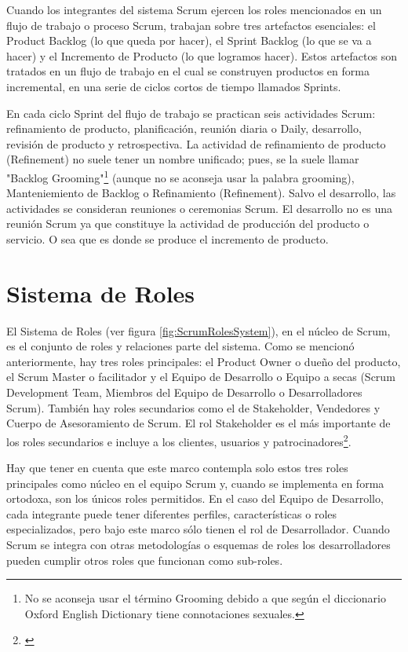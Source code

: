 Cuando los integrantes del sistema Scrum ejercen los roles mencionados en un flujo de trabajo o proceso Scrum, trabajan sobre tres artefactos esenciales: el Product Backlog (lo que queda por hacer), el Sprint Backlog (lo que se va a hacer) y el Incremento de Producto (lo que logramos hacer). Estos artefactos son tratados en un flujo de trabajo en el cual se construyen productos en forma incremental, en una serie de ciclos cortos de tiempo llamados Sprints. 

En cada ciclo Sprint del flujo de trabajo se practican seis actividades Scrum: refinamiento de producto, planificación, reunión diaria o Daily, desarrollo, revisión de producto y retrospectiva. La actividad de refinamiento de producto (Refinement) no suele tener un nombre unificado; pues, se la suele llamar "Backlog Grooming"\footnote{No se aconseja usar el término Grooming debido a que según el diccionario Oxford English Dictionary tiene connotaciones sexuales.} (aunque no se aconseja usar la palabra grooming), Manteniemiento de Backlog o Refinamiento (Refinement). Salvo el desarrollo, las actividades se consideran reuniones o ceremonias Scrum. El desarrollo no es una reunión Scrum ya que constituye la actividad de producción del producto o servicio. O sea que es donde se produce el incremento de producto.

\section{Sistema de Roles}

El Sistema de Roles (ver figura \ref{fig:ScrumRolesSystem}), en el núcleo de Scrum, es el conjunto de roles y relaciones parte del sistema. Como se mencionó anteriormente, hay tres roles principales: el Product Owner o dueño del producto, el Scrum Master o facilitador y el Equipo de Desarrollo o Equipo a secas (Scrum Development Team, Miembros del Equipo de Desarrollo o Desarrolladores Scrum). También hay roles secundarios como el de Stakeholder, Vendedores y Cuerpo de Asesoramiento de Scrum. El rol Stakeholder es el más importante de los roles secundarios e incluye a los clientes, usuarios y patrocinadores\footnote{\cite{SBOK-2013}}.

Hay que tener en cuenta que este marco contempla solo estos tres roles principales como núcleo en el equipo Scrum y, cuando se implementa en forma ortodoxa, son los únicos roles permitidos. En el caso del Equipo de Desarrollo, cada integrante puede tener diferentes perfiles, características o roles especializados, pero bajo este marco sólo tienen el rol de Desarrollador. Cuando Scrum se integra con otras metodologías o esquemas de roles los desarrolladores pueden cumplir otros roles que funcionan como sub-roles.

